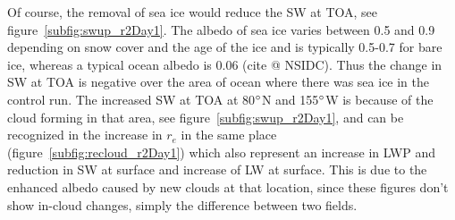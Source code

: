 
Of course, the removal of sea ice would reduce the SW at TOA, see figure~\ref{subfig:swup_r2Day1}. The albedo of sea ice varies between 0.5 and 0.9 depending on snow cover and the age of the ice and is typically 0.5-0.7 for bare ice, whereas a typical ocean albedo is 0.06 (cite @ NSIDC). Thus the change in SW at TOA is negative over the area of ocean where there was sea ice in the control run. The increased SW at TOA at 80$\degree$N and 155$\degree$W is because of the cloud forming in that area, see figure~\ref{subfig:swup_r2Day1}, and can be recognized in the increase in $r_e$ in the same place (figure~\ref{subfig:recloud_r2Day1}) which also represent an increase in LWP and reduction in SW at surface and increase of LW at surface. This is due to the enhanced albedo caused by new clouds at that location, since these figures don't show in-cloud changes, simply the difference between two fields.

